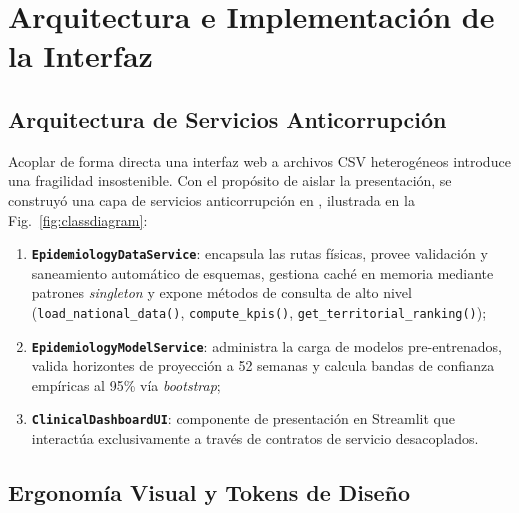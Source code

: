 \documentclass[conference]{IEEEtran}
\begin{document}
\section{Arquitectura e Implementaci\'on de la Interfaz}
\label{sec:interface}

\subsection{Arquitectura de Servicios Anticorrupci\'on}

Acoplar de forma directa una interfaz web a archivos CSV heterog\'eneos introduce una fragilidad insostenible. Con el prop\'osito de aislar la presentaci\'on, se construy\'o una capa de servicios anticorrupci\'on en , ilustrada en la Fig.~\ref{fig:classdiagram}:
\begin{enumerate}
  \item \textbf{\texttt{EpidemiologyDataService}}: encapsula las rutas f\'isicas, provee validaci\'on y saneamiento autom\'atico de esquemas, gestiona cach\'e en memoria mediante patrones \textit{singleton} y expone m\'etodos de consulta de alto nivel (\texttt{load\_national\_data()}, \texttt{compute\_kpis()}, \texttt{get\_territorial\_ranking()});
  \item \textbf{\texttt{EpidemiologyModelService}}: administra la carga de modelos pre-entrenados, valida horizontes de proyecci\'on a 52 semanas y calcula bandas de confianza emp\'iricas al 95\% v\'ia \textit{bootstrap};
  \item \textbf{\texttt{ClinicalDashboardUI}}: componente de presentaci\'on en Streamlit que interact\'ua exclusivamente a trav\'es de contratos de servicio desacoplados.
\end{enumerate}

\subsection{Ergonom\'ia Visual y Tokens de Dise\~no}
\end{document}

